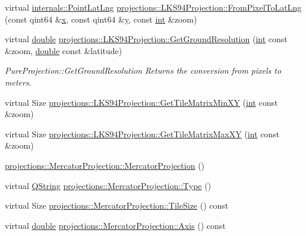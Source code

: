 \begin{DoxyCompactItemize}
\item 
virtual \hyperlink{structinternals_1_1_point_lat_lng}{internals\-::\-Point\-Lat\-Lng} \hyperlink{group___o_p_map_widget_gaeaf114d1ac8b52fc06bffdd1efd0ed24}{projections\-::\-L\-K\-S94\-Projection\-::\-From\-Pixel\-To\-Lat\-Lng} (const qint64 \&\hyperlink{glext_8h_a1db9d104e3c2128177f26aff7b46982f}{x}, const qint64 \&\hyperlink{glext_8h_a42315f3ed8fff752bb47fd782309fcfc}{y}, const \hyperlink{ioapi_8h_a787fa3cf048117ba7123753c1e74fcd6}{int} \&zoom)
\item 
virtual \hyperlink{_super_l_u_support_8h_a8956b2b9f49bf918deed98379d159ca7}{double} \hyperlink{group___o_p_map_widget_ga8ec3073798d3fd7b19d1e62aac216fd7}{projections\-::\-L\-K\-S94\-Projection\-::\-Get\-Ground\-Resolution} (\hyperlink{ioapi_8h_a787fa3cf048117ba7123753c1e74fcd6}{int} const \&zoom, \hyperlink{_super_l_u_support_8h_a8956b2b9f49bf918deed98379d159ca7}{double} const \&latitude)
\begin{DoxyCompactList}\small\item\em Pure\-Projection\-::\-Get\-Ground\-Resolution Returns the conversion from pixels to meters. \end{DoxyCompactList}\item 
virtual Size \hyperlink{group___o_p_map_widget_ga86d31a1ce953b8c93d0ee6b7dd4d7db6}{projections\-::\-L\-K\-S94\-Projection\-::\-Get\-Tile\-Matrix\-Min\-X\-Y} (\hyperlink{ioapi_8h_a787fa3cf048117ba7123753c1e74fcd6}{int} const \&zoom)
\item 
virtual Size \hyperlink{group___o_p_map_widget_gaa838d53afb098ce93a50200bf0f79dec}{projections\-::\-L\-K\-S94\-Projection\-::\-Get\-Tile\-Matrix\-Max\-X\-Y} (\hyperlink{ioapi_8h_a787fa3cf048117ba7123753c1e74fcd6}{int} const \&zoom)
\item 
\hyperlink{group___o_p_map_widget_gacccd26328cbdd182922e0a0b2e265529}{projections\-::\-Mercator\-Projection\-::\-Mercator\-Projection} ()
\item 
virtual \hyperlink{group___u_a_v_objects_plugin_gab9d252f49c333c94a72f97ce3105a32d}{Q\-String} \hyperlink{group___o_p_map_widget_gaefd6d064dd9c4c6cfc431ead163f706a}{projections\-::\-Mercator\-Projection\-::\-Type} ()
\item 
virtual Size \hyperlink{group___o_p_map_widget_gab8dee05993ebd618b81c24cb3548076a}{projections\-::\-Mercator\-Projection\-::\-Tile\-Size} () const 
\item 
virtual \hyperlink{_super_l_u_support_8h_a8956b2b9f49bf918deed98379d159ca7}{double} \hyperlink{group___o_p_map_widget_ga982d1100874717420bf3ab65e74c9c9d}{projections\-::\-Mercator\-Projection\-::\-Axis} () const 

\end{DoxyCompactItemize}
